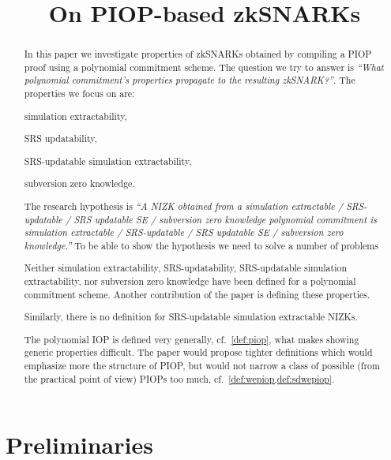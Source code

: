 \documentclass[runningheads,11pt]{llncs}
\title{On PIOP-based zkSNARKs}
\author{}
\institute{}
\newcommand{\say}[1]{\emph{``#1''}}
\begin{document}
 \sloppy \maketitle

\begin{abstract}
  In this paper we investigate properties of zkSNARKs obtained by
  compiling a PIOP proof using a polynomial commitment scheme. The question we
  try to answer is \say{What polynomial commitment's properties propagate to
    the resulting zkSNARK?}. The properties we focus on are:
  \begin{compactenum}
  \item simulation extractability,
  \item SRS updatability,
  \item SRS-updatable simulation extractability,
  \item subversion zero knowledge.
  \end{compactenum}
  The research hypothesis is \say{A NIZK obtained from a simulation extractable /
    SRS-updatable / SRS updatable SE / subversion zero knowledge polynomial
    commitment is simulation extractable /
    SRS-updatable / SRS updatable SE / subversion zero knowledge.} To be able to
  show the hypothesis we need to solve a number of problems
  \begin{compactenum}
  \item Neither simulation extractability, SRS-updatability, SRS-updatable
    simulation extractability, nor subversion zero knowledge have been defined
    for a polynomial commitment scheme. Another contribution of the paper is
    defining these properties. 
  \item Similarly, there is no definition for SRS-updatable simulation
    extractable NIZKs.
  \item The polynomial IOP is defined very generally, cf.~\cref{def:piop}, what
    makes showing generic properties difficult. The paper would propose tighter
    definitions which would emphasize more the structure of PIOP,
    but would not narrow a class of possible (from the practical point of view)
    PIOPs too much, cf.~\cref{def:wepiop,def:sdwepiop}.
  \end{compactenum}
  
\end{abstract}

\section{Preliminaries}
\end{document}
